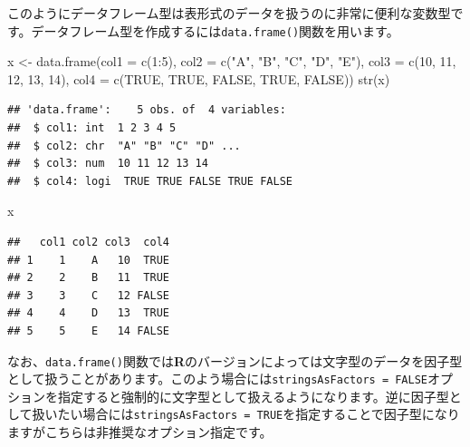 \documentclass[
  12pt,
]{book}
\newenvironment{Shaded}{\begin{snugshade}}{\end{snugshade}}
\newcommand{\AttributeTok}[1]{\textcolor[rgb]{0.77,0.63,0.00}{#1}}
\newcommand{\ConstantTok}[1]{\textcolor[rgb]{0.00,0.00,0.00}{#1}}
\newcommand{\DecValTok}[1]{\textcolor[rgb]{0.00,0.00,0.81}{#1}}
\newcommand{\FunctionTok}[1]{\textcolor[rgb]{0.00,0.00,0.00}{#1}}
\newcommand{\NormalTok}[1]{#1}
\newcommand{\OtherTok}[1]{\textcolor[rgb]{0.56,0.35,0.01}{#1}}
\newcommand{\SpecialCharTok}[1]{\textcolor[rgb]{0.00,0.00,0.00}{#1}}
\newcommand{\StringTok}[1]{\textcolor[rgb]{0.31,0.60,0.02}{#1}}
\begin{document}
このようにデータフレーム型は表形式のデータを扱うのに非常に便利な変数型です。データフレーム型を作成するには\texttt{data.frame()}関数を用います。

\begin{Shaded}
\begin{Highlighting}[numbers=left,,]
\NormalTok{x }\OtherTok{\textless{}{-}} \FunctionTok{data.frame}\NormalTok{(}\AttributeTok{col1 =} \FunctionTok{c}\NormalTok{(}\DecValTok{1}\SpecialCharTok{:}\DecValTok{5}\NormalTok{),}
                \AttributeTok{col2 =} \FunctionTok{c}\NormalTok{(}\StringTok{"A"}\NormalTok{, }\StringTok{"B"}\NormalTok{, }\StringTok{"C"}\NormalTok{, }\StringTok{"D"}\NormalTok{, }\StringTok{"E"}\NormalTok{),}
                \AttributeTok{col3 =} \FunctionTok{c}\NormalTok{(}\DecValTok{10}\NormalTok{, }\DecValTok{11}\NormalTok{, }\DecValTok{12}\NormalTok{, }\DecValTok{13}\NormalTok{, }\DecValTok{14}\NormalTok{),}
                \AttributeTok{col4 =} \FunctionTok{c}\NormalTok{(}\ConstantTok{TRUE}\NormalTok{, }\ConstantTok{TRUE}\NormalTok{, }\ConstantTok{FALSE}\NormalTok{, }\ConstantTok{TRUE}\NormalTok{, }\ConstantTok{FALSE}\NormalTok{))}
\FunctionTok{str}\NormalTok{(x)}
\end{Highlighting}
\end{Shaded}

\begin{verbatim}
## 'data.frame':    5 obs. of  4 variables:
##  $ col1: int  1 2 3 4 5
##  $ col2: chr  "A" "B" "C" "D" ...
##  $ col3: num  10 11 12 13 14
##  $ col4: logi  TRUE TRUE FALSE TRUE FALSE
\end{verbatim}

\begin{Shaded}
\begin{Highlighting}[numbers=left,,]
\NormalTok{x}
\end{Highlighting}
\end{Shaded}

\begin{verbatim}
##   col1 col2 col3  col4
## 1    1    A   10  TRUE
## 2    2    B   11  TRUE
## 3    3    C   12 FALSE
## 4    4    D   13  TRUE
## 5    5    E   14 FALSE
\end{verbatim}

なお、\texttt{data.frame()}関数では\textbf{R}のバージョンによっては文字型のデータを因子型として扱うことがあります。このよう場合には\texttt{stringsAsFactors\ =\ FALSE}オプションを指定すると強制的に文字型として扱えるようになります。逆に因子型として扱いたい場合には\texttt{stringsAsFactors\ =\ TRUE}を指定することで因子型になりますがこちらは非推奨なオプション指定です。
\end{document}
